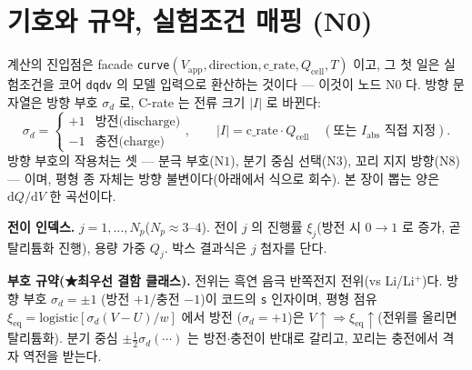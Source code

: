 \documentclass[11pt,a4paper]{article}
\newcommand{\dd}{\mathrm{d}}
\newcommand{\eq}{\mathrm{eq}}
\newcommand{\app}{\mathrm{app}}
\newcommand{\cell}{\mathrm{cell}}
\newcommand{\code}[1]{\texttt{#1}}
\begin{document}
\tableofcontents
\newpage

\section{기호와 규약, 실험조건 매핑 (N0)}\label{sec:notation}
계산의 진입점은 facade \code{curve}$(V_\app,\text{direction},\text{c\_rate},Q_\cell,T)$ 이고, 그 첫 일은 실험조건을
코어 \code{dqdv} 의 모델 입력으로 환산하는 것이다 — 이것이 노드 $\mathrm N0$ 다. 방향 문자열은 방향 부호 $\sigma_d$ 로,
C-rate 는 전류 크기 $|I|$ 로 바뀐다:
\begin{equation}
\sigma_d=\begin{cases}+1 & \text{방전(discharge)}\\ -1 & \text{충전(charge)}\end{cases},
\qquad
|I|=\text{c\_rate}\cdot Q_\cell\quad(\text{또는 }I_\mathrm{abs}\text{ 직접 지정}).
\label{eq:n0map}
\end{equation}
방향 부호의 작용처는 셋 — 분극 부호($\mathrm N1$), 분기 중심 선택($\mathrm N3$), 꼬리 지지 방향($\mathrm N8$) — 이며,
평형 종 자체는 방향 불변이다(아래에서 식으로 회수). 본 장이 뽑는 양은 $\dd Q/\dd V$ 한 곡선이다.

\textbf{전이 인덱스.} $j=1,\dots,N_p$($N_p\approx3$--$4$). 전이 $j$ 의 진행률 $\xi_j$(방전 시 $0\to1$ 로 증가, 곧 탈리튬화 진행),
용량 가중 $Q_j$. 박스 결과식은 $j$ 첨자를 단다.

\textbf{부호 규약(★최우선 결함 클래스).} 전위는 흑연 음극 반쪽전지 전위(vs Li/Li$^+$)다. 방향 부호 $\sigma_d=\pm1$
(방전 $+1$/충전 $-1$)이 코드의 \code{s} 인자이며, 평형 점유 $\xi_\eq=\mathrm{logistic}[\sigma_d(V-U)/w]$ 에서 방전
($\sigma_d=+1$)은 $V\!\uparrow\Rightarrow\xi_\eq\!\uparrow$(전위를 올리면 탈리튬화). 분기 중심 $\pm\tfrac12\sigma_d(\cdots)$
는 방전$\cdot$충전이 반대로 갈리고, 꼬리는 충전에서 격자 역전을 받는다.
\end{document}
